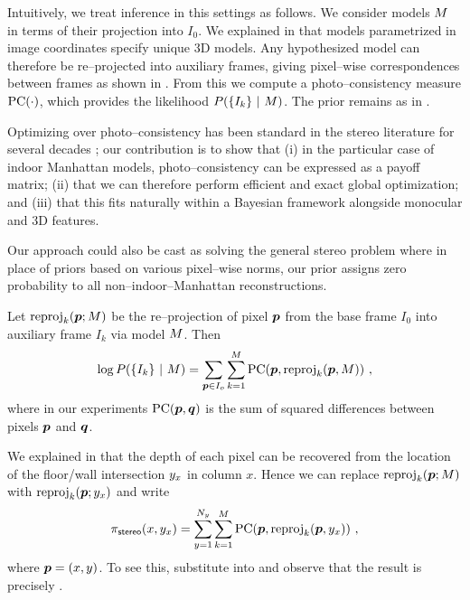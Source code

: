 Intuitively, we treat inference in this settings as follows. We
consider models $M$ in terms of their projection into $I_0$. We
explained in  that models parametrized in image
coordinates specify unique 3D models. Any hypothesized model can
therefore be re--projected into auxiliary frames, giving pixel--wise
correspondences between frames as shown in . From
this we compute a photo--consistency measure $\operatorname{PC}(\cdot)$, which
provides the likelihood $P(\{I_k\} ~|~ M)$. The prior remains
as in .

Optimizing over photo--consistency has been standard in the stereo
literature for several decades \cite{Scharstein01}; our contribution
is to show that (i) in the particular case of indoor Manhattan models,
photo--consistency can be expressed as a payoff matrix; (ii) that we
can therefore perform efficient and exact global optimization; and
(iii) that this fits naturally within a Bayesian framework alongside
monocular and 3D features.

Our approach could also be cast as solving the general stereo problem
where in place of priors based on various pixel--wise norms, our prior
assigns zero probability to all non--indoor--Manhattan
reconstructions.

Let $\operatorname{reproj}_k(\boldsymbol{p};M)$ be the re--projection of pixel $\boldsymbol{p}$
from the base frame $I_0$ into auxiliary frame $I_k$ via model
$M$. Then
\begin{equation}
  \label{eq:stereo-likelihood}
  \log P(\{I_k\} ~|~ M) = 
   \sum_{\boldsymbol{p}\in I_o} \sum_{k=1}^M
  \operatorname{PC}(\boldsymbol{p},\operatorname{reproj}_k(\boldsymbol{p},M)) ~,
\end{equation}
where in our experiments $\operatorname{PC}(\boldsymbol{p},\boldsymbol{q})$ is the sum of squared
differences between pixels $\boldsymbol{p}$ and $\boldsymbol{q}$. 


We explained in  that the depth of each pixel can be
recovered from the location of the floor/wall intersection $y_x$
in column $x$. Hence we can replace $\operatorname{reproj}_k(\boldsymbol{p};M)$ with
$\operatorname{reproj}_k(\boldsymbol{p};y_x)$ and write
\begin{equation}
  \label{eq:stereo-payoffs}
  \pi_{\textsf{stereo}}(x,y_x) = 
    \sum_{y=1}^{N_y} \sum_{k=1}^M
      \operatorname{PC}(\boldsymbol{p},\operatorname{reproj}_k(\boldsymbol{p},y_x)) ~,
\end{equation}
where $\boldsymbol{p}=(x,y)$. To see this, substitute 
into  and observe that the result is
precisely .

